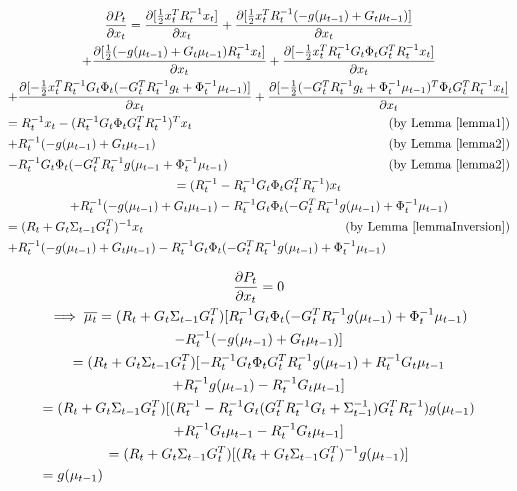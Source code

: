 \begin{multline*}
\frac{\partial P_t}{\partial x_t} = \frac{\partial [\frac{1}{2} x_t^T R_t^{-1}x_t]}{\partial x_t} + \frac{\partial [\frac{1}{2} x_t^TR_t^{-1}(-g(\mu_{t-1})+G_t\mu_{t-1})]}{\partial x_t} \\
+ \frac{\partial [\frac{1}{2} (-g(\mu_{t-1})+G_t\mu_{t-1})R_t^{-1}x_t]}{\partial x_t} + \frac{\partial [-\frac{1}{2} x_t^TR_t^{-1}G_t\Phi_tG_t^TR_t^{-1}x_t]}{\partial x_t} \\
+ \frac{\partial [-\frac{1}{2} x_t^TR_t^{-1}G_t\Phi_t(-G_t^TR_t^{-1}g_t + \Phi_t^{-1}\mu_{t-1})]}{\partial x_t} + \frac{\partial [-\frac{1}{2} (-G_t^TR_t^{-1}g_t + \Phi_t^{-1}\mu_{t-1})^T\Phi_tG_t^TR_t^{-1}x_t]}{\partial x_t} \\
= R_t^{-1}x_t - (R_t^{-1}G_t\Phi_tG_t^TR_t^{-1})^Tx_t  \hfill \text{(by Lemma \ref{lemma1})} \\
+ R_t^{-1}(-g(\mu_{t-1}) + G_t\mu_{t-1}) \hfill \text{(by Lemma \ref{lemma2})} \\
-R_t^{-1}G_t\Phi_t(-G_t^TR_t^{-1}g(\mu_{t-1} + \Phi_t^{-1}\mu_{t-1}) \hfill \text{(by Lemma \ref{lemma2})} \\
= (R_t^{-1} - R_t^{-1}G_t\Phi_tG_t^TR_t^{-1})x_t \\
+ R_t^{-1}(-g(\mu_{t-1}) + G_t\mu_{t-1}) - R_t^{-1}G_t\Phi_t(-G_t^TR_t^{-1}g(\mu_{t-1}) + \Phi_t^{-1}\mu_{t-1}) \\
= (R_t + G_t\Sigma_{t-1}G_t^T)^{-1}x_t \hfill \text{(by Lemma \ref{lemmaInversion})} \\
+ R_t^{-1}(-g(\mu_{t-1}) + G_t\mu_{t-1}) - R_t^{-1}G_t\Phi_t(-G_t^TR_t^{-1}g(\mu_{t-1}) + \Phi_t^{-1}\mu_{t-1}) \hfill
\end{multline*}

\begin{multline*}
\frac{\partial P_t}{\partial x_t} = 0 \\
\implies \overline{\mu_t} = (R_t + G_t\Sigma_{t-1}G_t^T) [R_t^{-1}G_t\Phi_t(-G_t^TR_t^{-1}g(\mu_{t-1}) + \Phi_t^{-1}\mu_{t-1}) \\ - R_t^{-1}(-g(\mu_{t-1}) + G_t\mu_{t-1})] \\
= (R_t + G_t\Sigma_{t-1}G_t^T) [-R_t^{-1}G_t\Phi_tG_t^TR_t^{-1}g(\mu_{t-1}) + R_t^{-1}G_t\mu_{t-1} \\ + R_t^{-1}g(\mu_{t-1}) - R_t^{-1}G_t\mu_{t-1}] \\
= (R_t + G_t\Sigma_{t-1}G_t^T) [(R_t^{-1} - R_t^{-1}G_t(G_t^TR_t^{-1}G_t + \Sigma_{t-1}^{-1})G_t^TR_t^{-1})g(\mu_{t-1}) \\
+ R_t^{-1}G_t\mu_{t-1} - R_t^{-1}G_t\mu_{t-1}] \\
= (R_t + G_t\Sigma_{t-1}G_t^T)[(R_t + G_t\Sigma_{t-1}G_t^T)^{-1} g(\mu_{t-1})] \\
= g(\mu_{t-1}) \hfill
\end{multline*}

